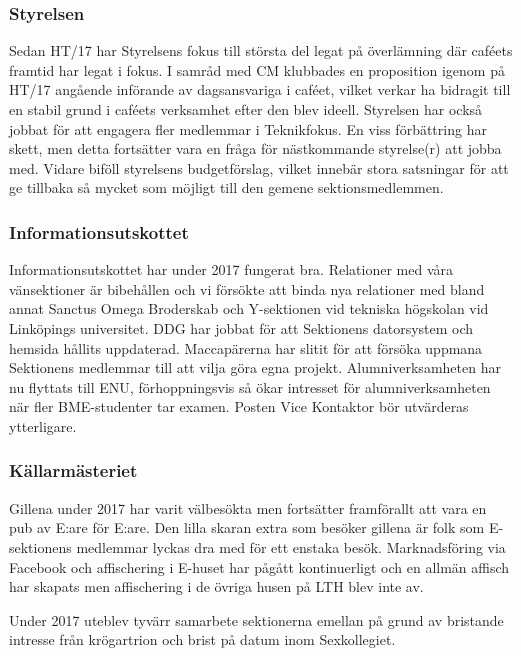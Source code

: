 \documentclass[../_main/handlingar.tex]{subfiles}
\begin{document}

\subsubsection*{Styrelsen}
Sedan HT/17 har Styrelsens fokus till största del legat på överlämning där caféets framtid har legat i fokus. I samråd med CM klubbades en proposition igenom på HT/17 angående införande av dagsansvariga i caféet, vilket verkar ha bidragit till en stabil grund i caféets verksamhet efter den blev ideell. Styrelsen har också jobbat för att engagera fler medlemmar i Teknikfokus. En viss förbättring har skett, men detta fortsätter vara en fråga för nästkommande styrelse(r) att jobba med. Vidare biföll styrelsens budgetförslag, vilket innebär stora satsningar för att ge tillbaka så mycket som möjligt till den gemene sektionsmedlemmen.

\subsubsection*{Informationsutskottet}
Informationsutskottet har under 2017 fungerat bra. Relationer med våra vänsektioner är bibehållen och vi försökte att binda nya relationer med bland annat Sanctus Omega Broderskab och Y-sektionen vid tekniska högskolan vid Linköpings universitet. DDG har jobbat för att Sektionens datorsystem och hemsida hållits uppdaterad. Maccapärerna har slitit för att försöka uppmana Sektionens medlemmar till att vilja göra egna projekt. Alumniverksamheten har nu flyttats till ENU, förhoppningsvis så ökar intresset för alumniverksamheten när fler BME-studenter tar examen. Posten Vice Kontaktor bör utvärderas ytterligare.

\subsubsection*{Källarmästeriet}
Gillena under 2017 har varit välbesökta men fortsätter framförallt att vara en pub av E:are för E:are. Den lilla skaran extra som besöker gillena är folk som E-sektionens medlemmar lyckas dra med för ett enstaka besök. Marknadsföring via Facebook och affischering i E-huset har pågått kontinuerligt och en allmän affisch har skapats men affischering i de övriga husen på LTH blev inte av.

Under 2017 uteblev tyvärr samarbete sektionerna emellan på grund av bristande intresse från krögartrion och brist på datum inom Sexkollegiet.
\end{document}
